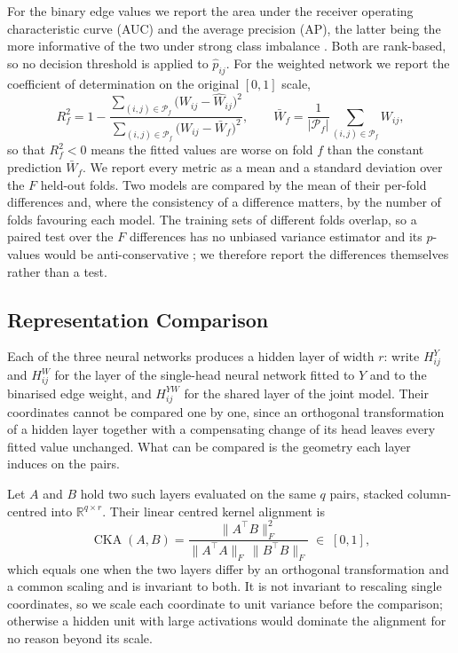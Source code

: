 For the binary edge values we report the area under the receiver operating characteristic curve (AUC) and the
average precision (AP), the latter being the more informative of the two under strong class imbalance
\citep{davis2006}. Both are rank-based, so no decision threshold is applied to \(\widehat p_{ij}\). For
the weighted network we report the coefficient of determination on the original \([0,1]\) scale,
\begin{equation}\label{eq:r2}
 R^{2}_{f}
 =1-\frac{\sum_{(i,j)\in\mathcal{P}_{f}}\bigl(W_{ij}-\widehat W_{ij}\bigr)^{2}}
     {\sum_{(i,j)\in\mathcal{P}_{f}}\bigl(W_{ij}-\bar W_{f}\bigr)^{2}},
 \qquad
 \bar W_{f}=\frac{1}{|\mathcal{P}_{f}|}\sum_{(i,j)\in\mathcal{P}_{f}}W_{ij},
\end{equation}
so that \(R^{2}_{f}<0\) means the fitted values are worse on fold \(f\) than the constant prediction
\(\bar W_{f}\). We report every metric as a mean and a standard deviation over the \(F\) held-out folds. Two models are
compared by the mean of their per-fold differences and, where the consistency of a difference matters, by
the number of folds favouring each model. The training sets of different folds overlap, so a paired test
over the \(F\) differences has no unbiased variance estimator and its \(p\)-values would be
anti-conservative \citep{bengio2004}; we therefore report the differences themselves rather than a test.

\subsection{Representation Comparison}
\label{sec:cka}

Each of the three neural networks produces a hidden layer of width \(r\): write \(H^{Y}_{ij}\) and
\(H^{W}_{ij}\) for the layer of the single-head neural network fitted to \(Y\) and to the binarised edge
weight, and \(H^{YW}_{ij}\) for the shared layer of the joint model. Their coordinates cannot be
compared one by one, since an orthogonal transformation of a hidden layer together with a compensating
change of its head leaves every fitted value unchanged. What can be compared is the geometry each layer
induces on the pairs.

Let \(A\) and \(B\) hold two such layers evaluated on the same \(q\) pairs, stacked column-centred into
\(\mathbb{R}^{q\times r}\). Their linear centred kernel alignment \citep{kornblith2019} is
\begin{equation}\label{eq:cka}
 \operatorname{CKA}(A,B)
 =\frac{\bigl\lVert A^{\top}B\bigr\rVert_{F}^{2}}
       {\bigl\lVert A^{\top}A\bigr\rVert_{F}\,\bigl\lVert B^{\top}B\bigr\rVert_{F}}
 \;\in\;[0,1],
\end{equation}
which equals one when the two layers differ by an orthogonal transformation and a common scaling and is
invariant to both. It is not invariant to rescaling single coordinates, so we scale each coordinate to unit
variance before the comparison; otherwise a hidden unit with large activations would dominate the
alignment for no reason beyond its scale.

